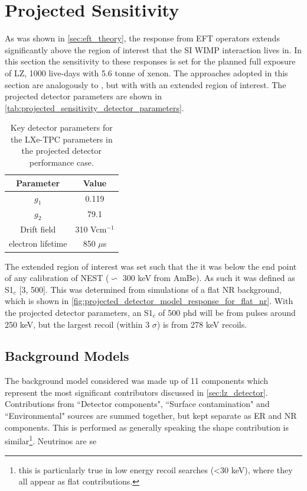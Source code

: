 \section{Projected Sensitivity}
\par
As was shown in \autoref{sec:eft_theory}, the response from EFT operators extends significantly above the region of interest that the SI WIMP interaction lives in.
In this section the sensitivity to these responses is set for the planned full exposure of LZ, 1000 live-days with 5.6 tonne of xenon.
The approaches adopted in this section are analogously to \cite{LZ_projected_sensitivity_paper_ref}, but with with an extended region of interest.
The projected detector parameters are shown in \autoref{tab:projected_sensitivity_detector_parameters}.
\begin{table}[]
    \centering
    \begin{tabular}{c|c}
        Parameter   & Value  \\ \hline
        $g_{1}$     & 0.119 \\
        $g_{2}$     & 79.1  \\
        Drift field & 310 Vcm$^{-1}$ \\
        electron lifetime & 850 $\mu$s
    \end{tabular}
    \caption{Key detector parameters for the LXe-TPC parameters in the projected detector performance case.}
    \label{tab:projected_sensitivity_detector_parameters}
\end{table}
\par
The extended region of interest was set such that the it was below the end point of any calibration of NEST ($\backsim$ 300 keV from AmBe).
As such it was defined as S1$_c$ [3, 500].
This was determined from simulations of a flat NR background, which is shown in \autoref{fig:projected_detector_model_response_for_flat_nr}.
With the projected detector parameters, an S1$_c$ of 500 phd will be from pulses around 250 keV, but the largest recoil (within 3 $\sigma$) is from 278 keV recoils.



\subsection{Background Models}
\par
The background model considered was made up of 11 components which represent the most significant contributors discussed in \autoref{sec:lz_detector}.
Contributions from ``Detector components", ``Surface contamination" and ``Environmental" sources are summed together, but kept separate as ER and NR components.
This is performed as generally speaking the shape contribution is similar\footnote{this is particularly true in low energy recoil searches (<30 keV), where they all appear as flat contributions.}.
Neutrinos are se



